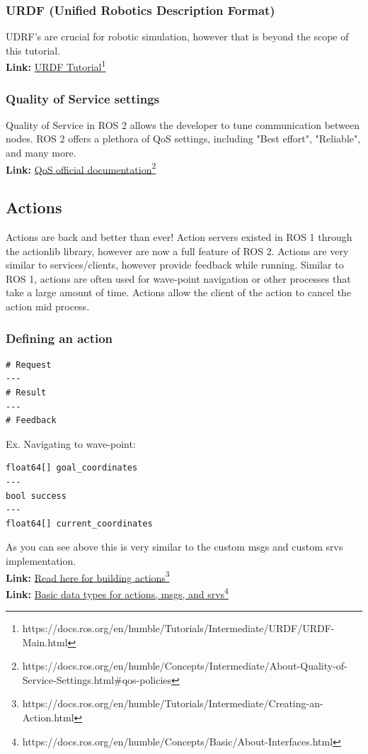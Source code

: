 \documentclass[11pt]{article}
\newcommand{\link}[2]{\textbf{Link: }\textcolor{blue}{\href{#2}{#1}}\footnote{#2}}
\begin{document}
\subsubsection{URDF (Unified Robotics Description Format)}
UDRF's are crucial for robotic simulation, however that is beyond the scope of this tutorial.\\
\link{URDF Tutorial}{https://docs.ros.org/en/humble/Tutorials/Intermediate/URDF/URDF-Main.html}\\
\subsubsection{Quality of Service settings}
Quality of Service in ROS 2 allows the developer to tune communication between nodes. ROS 2 offers a plethora of QoS settings, including "Best effort", "Reliable", and many more.\\
\link{QoS official documentation}{https://docs.ros.org/en/humble/Concepts/Intermediate/About-Quality-of-Service-Settings.html\#qos-policies}\\

\subsection{Actions}
Actions are back and better than ever! Action servers existed in ROS 1 through the actionlib library, however are now a full feature of ROS 2. Actions are very similar to services/clients, however provide feedback while running. Similar to ROS 1, actions are often used for wave-point navigation or other processes that take a large amount of time. Actions allow the client of the action to cancel the action mid process. 

\subsubsection{Defining an action}
\lstset{language=c++}
\begin{lstlisting}
# Request
---
# Result
---
# Feedback
\end{lstlisting}
Ex. Navigating to wave-point:
\begin{lstlisting}
float64[] goal_coordinates
---
bool success
---
float64[] current_coordinates
\end{lstlisting} 
As you can see above this is very similar to the custom msgs and custom srvs implementation.\\
\link{Read here for building actions}{https://docs.ros.org/en/humble/Tutorials/Intermediate/Creating-an-Action.html}\\
\link{Basic data types for actions, msgs, and srvs}{https://docs.ros.org/en/humble/Concepts/Basic/About-Interfaces.html}\\
\end{document}
